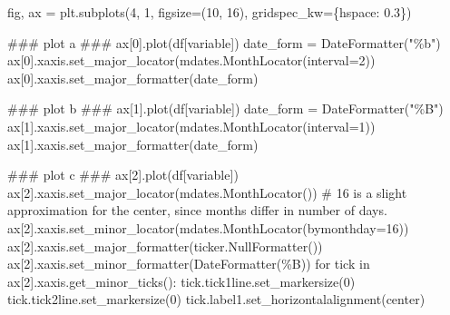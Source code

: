 \documentclass[
  letterpaper,
  DIV=11,
  numbers=noendperiod,
  oneside]{scrreprt}
\newenvironment{Shaded}{\begin{snugshade}}{\end{snugshade}}
\newcommand{\AlertTok}[1]{\textcolor[rgb]{0.68,0.00,0.00}{#1}}
\newcommand{\CommentTok}[1]{\textcolor[rgb]{0.37,0.37,0.37}{#1}}
\newcommand{\ControlFlowTok}[1]{\textcolor[rgb]{0.00,0.23,0.31}{#1}}
\newcommand{\DecValTok}[1]{\textcolor[rgb]{0.68,0.00,0.00}{#1}}
\newcommand{\FloatTok}[1]{\textcolor[rgb]{0.68,0.00,0.00}{#1}}
\newcommand{\KeywordTok}[1]{\textcolor[rgb]{0.00,0.23,0.31}{#1}}
\newcommand{\NormalTok}[1]{\textcolor[rgb]{0.00,0.23,0.31}{#1}}
\newcommand{\OperatorTok}[1]{\textcolor[rgb]{0.37,0.37,0.37}{#1}}
\newcommand{\StringTok}[1]{\textcolor[rgb]{0.13,0.47,0.30}{#1}}
\begin{document}
\begin{Shaded}
\begin{Highlighting}[]
\NormalTok{fig, ax }\OperatorTok{=}\NormalTok{ plt.subplots(}\DecValTok{4}\NormalTok{, }\DecValTok{1}\NormalTok{, figsize}\OperatorTok{=}\NormalTok{(}\DecValTok{10}\NormalTok{, }\DecValTok{16}\NormalTok{),}
\NormalTok{                       gridspec\_kw}\OperatorTok{=}\NormalTok{\{}\StringTok{\textquotesingle{}hspace\textquotesingle{}}\NormalTok{: }\FloatTok{0.3}\NormalTok{\})}

\CommentTok{\#\#\# plot a }\AlertTok{\#\#\#}
\NormalTok{ax[}\DecValTok{0}\NormalTok{].plot(df[}\StringTok{\textquotesingle{}variable\textquotesingle{}}\NormalTok{])}
\NormalTok{date\_form }\OperatorTok{=}\NormalTok{ DateFormatter(}\StringTok{"\%b"}\NormalTok{)}
\NormalTok{ax[}\DecValTok{0}\NormalTok{].xaxis.set\_major\_locator(mdates.MonthLocator(interval}\OperatorTok{=}\DecValTok{2}\NormalTok{))}
\NormalTok{ax[}\DecValTok{0}\NormalTok{].xaxis.set\_major\_formatter(date\_form)}

\CommentTok{\#\#\# plot b }\AlertTok{\#\#\#}
\NormalTok{ax[}\DecValTok{1}\NormalTok{].plot(df[}\StringTok{\textquotesingle{}variable\textquotesingle{}}\NormalTok{])}
\NormalTok{date\_form }\OperatorTok{=}\NormalTok{ DateFormatter(}\StringTok{"\%B"}\NormalTok{)}
\NormalTok{ax[}\DecValTok{1}\NormalTok{].xaxis.set\_major\_locator(mdates.MonthLocator(interval}\OperatorTok{=}\DecValTok{1}\NormalTok{))}
\NormalTok{ax[}\DecValTok{1}\NormalTok{].xaxis.set\_major\_formatter(date\_form)}

\CommentTok{\#\#\# plot c }\AlertTok{\#\#\#}
\NormalTok{ax[}\DecValTok{2}\NormalTok{].plot(df[}\StringTok{\textquotesingle{}variable\textquotesingle{}}\NormalTok{])}
\NormalTok{ax[}\DecValTok{2}\NormalTok{].xaxis.set\_major\_locator(mdates.MonthLocator())}
\CommentTok{\# 16 is a slight approximation for the center, since months differ in number of days.}
\NormalTok{ax[}\DecValTok{2}\NormalTok{].xaxis.set\_minor\_locator(mdates.MonthLocator(bymonthday}\OperatorTok{=}\DecValTok{16}\NormalTok{))}
\NormalTok{ax[}\DecValTok{2}\NormalTok{].xaxis.set\_major\_formatter(ticker.NullFormatter())}
\NormalTok{ax[}\DecValTok{2}\NormalTok{].xaxis.set\_minor\_formatter(DateFormatter(}\StringTok{\textquotesingle{}\%B\textquotesingle{}}\NormalTok{))}
\ControlFlowTok{for}\NormalTok{ tick }\KeywordTok{in}\NormalTok{ ax[}\DecValTok{2}\NormalTok{].xaxis.get\_minor\_ticks():}
\NormalTok{    tick.tick1line.set\_markersize(}\DecValTok{0}\NormalTok{)}
\NormalTok{    tick.tick2line.set\_markersize(}\DecValTok{0}\NormalTok{)}
\NormalTok{    tick.label1.set\_horizontalalignment(}\StringTok{\textquotesingle{}center\textquotesingle{}}\NormalTok{)}


\end{Highlighting}
\end{Shaded}
\end{document}
